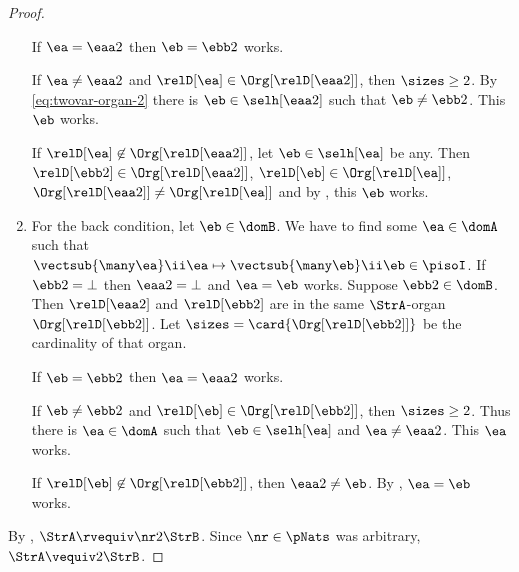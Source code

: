 \begin{proof}
\begin{enumerate}
  If $\ea = \eaa2$ then $\eb = \ebb2$ works.
 
  If $\ea \neq \eaa2$ and $\relD[\ea] \in \Org[\relD[\eaa2]]$, then
  $\sizes \geq 2$.
  By \cref{eq:twovar-organ-2} there is $\eb \in \selh[\eaa2]$ such that
  $\eb \neq \ebb2$. This $\eb$ works.

  If $\relD[\ea] \not\in \Org[\relD[\eaa2]]$, let $\eb \in \selh[\ea]$ be any.
  Then $\relD[\ebb2] \in \Org[\relD[\eaa2]]$, $\relD[\eb] \in \Org[\relD[\ea]]$,
  $\Org[\relD[\eaa2]] \neq \Org[\relD[\ea]]$ and by
  , this $\eb$ works.
  
  \item For the back condition, let $\eb \in \domB$.
  We have to find some $\ea \in \domA$ such that
  $\vectsub{\many\ea}\ii\ea \mapsto \vectsub{\many\eb}\ii\eb \in \pisoI$.
  If $\ebb2 = \bot$ then $\eaa2 = \bot$ and $\ea = \eb$ works.
  Suppose $\ebb2 \in \domB$. Then $\relD[\eaa2]$ and $\relD[\ebb2]$ are in the
  same $\StrA$-organ $\Org[\relD[\ebb2]]$.
  Let $\sizes = \card{\Org[\relD[\ebb2]]}$ be the cardinality of that organ.
  
  If $\eb = \ebb2$ then $\ea = \eaa2$ works.
  
  If $\eb \neq \ebb2$ and $\relD[\eb] \in \Org[\relD[\ebb2]]$, then
  $\sizes \geq 2$.
  Thus there is $\ea \in \domA$ such that $\eb \in \selh[\ea]$ and
  $\ea \neq \eaa2$.
  This $\ea$ works.
  
  If $\relD[\eb] \not\in \Org[\relD[\ebb2]]$, then $\eaa2 \neq \eb$.
  By , $\ea = \eb$ works.
\end{enumerate}
By , $\StrA \rvequiv\nr2 \StrB$.
Since $\nr \in \pNats$ was arbitrary, $\StrA \vequiv2 \StrB$.
\end{proof}